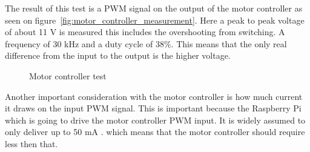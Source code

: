 The result of this test is a PWM signal on the output of the motor controller as seen on figure~\ref{fig:motor_controller_measurement}. Here a peak to peak voltage of about 11 V is measured this includes the overshooting from switching. A frequency of 30 kHz and a duty cycle of 38\%. This means that the only real difference from the input to the output is the higher voltage.
\begin{figure}[H]
	\centering
	\hfill
	\hfill
	\caption{Motor controller test}
\end{figure}

Another important consideration with the motor controller is how much current it draws on the input PWM signal. This is important because the Raspberry Pi which is going to drive the motor controller PWM input. It is widely assumed to only deliver up to 50 mA \cite{rpi-current}. which means that the motor controller should require less then that.

